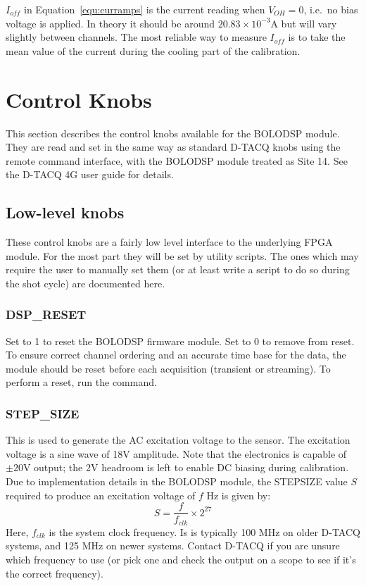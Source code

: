 \documentclass[12pt,a4paper]{article}
\begin{document}
$I_{off}$ in Equation~\ref{equ:curramps} is the current reading when $V_{OH} = 0$, i.e.\ no bias voltage is applied. In theory it should be around
$20.83 \times 10^{-3} \mathrm{A}$ but will vary slightly between channels. The most reliable way to measure $I_{off}$ is to take the mean value of
the current during the cooling part of the calibration.

\section{Control Knobs}%
\label{sec:knobs}
This section describes the control knobs available for the BOLODSP module. They are read and set in the same way as standard D-TACQ knobs using the remote
command interface, with the BOLODSP module treated as Site 14. See the D-TACQ 4G user guide for details.

\subsection{Low-level knobs}%
\label{sec:knobsll}
These control knobs are a fairly low level interface to the underlying FPGA module. For the most part they will be set by utility scripts. The ones which
may require the user to manually set them (or at least write a script to do so during the shot cycle) are documented here.

\subsubsection{DSP{\_}RESET}
Set to 1 to reset the BOLODSP firmware module. Set to 0 to remove from reset. To ensure correct channel ordering and an accurate time base for the data,
the module should be reset before each acquisition (transient or streaming). To perform a reset, run the \mbox{} command.

\subsubsection{STEP{\_}SIZE}
This is used to generate the AC excitation voltage to the sensor. The excitation voltage is a sine wave of 18V amplitude. Note that the electronics is
capable of $\pm 20\mathrm{V}$ output; the 2V headroom is left to enable DC biasing during calibration. Due to implementation details in the BOLODSP
module, the STEP{\textunderscore}SIZE value $S$ required to produce an excitation voltage of $f$ Hz is given by:
\begin{equation}
  \label{equ:step_size}
  S = \frac{f}{f_{clk}} \times 2^{27}
\end{equation}
Here, $f_{clk}$ is the system clock frequency. Is is typically 100 MHz on older D-TACQ systems, and 125 MHz on newer systems. Contact D-TACQ if you are
unsure which frequency to use (or pick one and check the output on a scope to see if it's the correct frequency).
\end{document}
